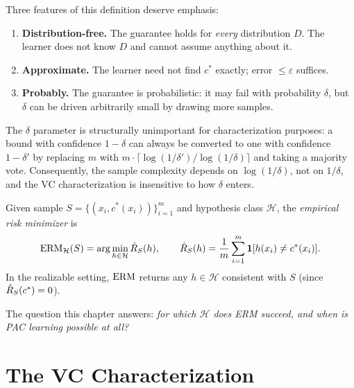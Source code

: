 Three features of this definition deserve emphasis:

\begin{enumerate}[leftmargin=*,itemsep=3pt]
\item \textbf{Distribution-free.}  The guarantee holds for \emph{every}
  distribution $D$.  The learner does not know $D$ and cannot assume anything
  about it.
\item \textbf{Approximate.}  The learner need not find $c^*$ exactly; error
  $\leq \varepsilon$ suffices.
\item \textbf{Probably.}  The guarantee is probabilistic: it may fail with
  probability $\delta$, but $\delta$ can be driven arbitrarily small by
  drawing more samples.
\end{enumerate}

\begin{remark}
\label{rmk:delta}
The $\delta$ parameter is structurally unimportant for characterization
purposes: a bound with confidence $1 - \delta$ can always be converted to one
with confidence $1 - \delta'$ by replacing $m$ with $m \cdot
\lceil\log(1/\delta')/\log(1/\delta)\rceil$ and taking a majority vote.
Consequently, the sample complexity depends on $\log(1/\delta)$, not on
$1/\delta$, and the VC characterization is insensitive to how $\delta$ enters.
\end{remark}

\begin{defn}
\label{def:erm}
Given sample $S = \{(x_i, c^*(x_i))\}_{i=1}^m$ and hypothesis class
$\mathcal{H}$, the \emph{empirical risk minimizer} is
\[
  \mathrm{ERM}_\mathcal{H}(S) = \arg\min_{h \in \mathcal{H}} \hat{R}_S(h),
  \qquad
  \hat{R}_S(h) = \frac{1}{m}\sum_{i=1}^m \mathbf{1}[h(x_i) \neq c^*(x_i)].
\]
In the realizable setting, $\mathrm{ERM}$ returns any $h \in \mathcal{H}$ consistent
with $S$ (since $\hat{R}_S(c^*) = 0$).
\end{defn}

The question this chapter answers: \emph{for which $\mathcal{H}$ does ERM
succeed, and when is PAC learning possible at all?}



\section{The VC Characterization}
\label{sec:vc-char}

